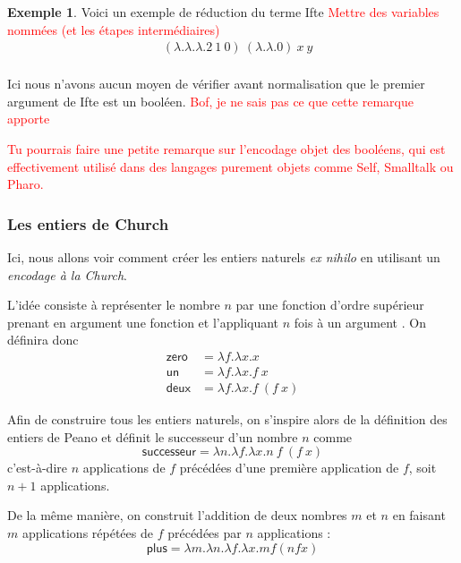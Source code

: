\documentclass {article}
\theoremstyle{definition}
\newtheorem{example}{Exemple}
\theoremstyle{remark}
\newcommand{\todo}[1]{\textcolor{red}{#1}}
\begin{document}
\begin{example}
  Voici un exemple de réduction du terme Ifte \todo{Mettre des variables nommées (et les étapes intermédiaires)}
  \begin{align*}
    &(\lambda .\lambda .\lambda . 2\: 1\: 0) \: (\lambda . \lambda . 0) \: x \: y  \\
    & %
  \end{align*}
\end{example}

Ici nous n'avons aucun moyen de vérifier avant normalisation que le premier
argument de Ifte est un booléen. \todo{Bof, je ne sais pas ce que cette remarque apporte} %

\todo{Tu pourrais faire une petite remarque sur l'encodage objet des
  booléens, qui est effectivement utilisé dans des langages purement
  objets comme Self, Smalltalk ou Pharo.}

\subsubsection{Les entiers de Church}

Ici, nous allons voir comment créer
les entiers naturels \textit{ex nihilo} en utilisant un \emph{encodage à
  la Church}.

L'idée consiste à représenter le nombre \(n\) par une fonction d'ordre
supérieur prenant en argument une fonction  et l'appliquant \(n\)
fois à un argument . On définira donc 
%
\begin{align*}
\mathsf{zero} &= \lambda f. \lambda x. x \\
\mathsf{un}   &= \lambda f. \lambda x. f\: x \\
\mathsf{deux} &= \lambda f. \lambda x. f\: (f\: x)
\end{align*}

Afin de construire tous les entiers naturels, on s'inspire alors de la
définition des entiers de Peano et définit le successeur d'un nombre \(n\)
comme
%
\[
\mathsf{successeur} = \lambda n. \lambda f. \lambda x. n\: f\: (f\: x)
\]
%
c'est-à-dire \(n\) applications de \(f\) précédées d'une première
application de \(f\), soit \(n+1\) applications.

De la même manière, on construit l'addition de deux nombres \(m\) et
\(n\) en faisant \(m\) applications répétées de \(f\) précédées par
\(n\) applications :
%
\[
\mathsf{plus} = \lambda m. \lambda n. \lambda f. \lambda x. m f (n f x)
\]
\end{document}
